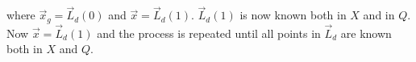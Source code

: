 where $\vec{x}_g = \vec{L}_d(0)$ and $\vec{x} = \vec{L}_d(1)$.  $\vec{L}_d(1)$ is now known both in $X$ and in $Q$.  Now $\vec{x} = \vec{L}_d(1)$ and the process is repeated until all points in $\vec{L}_d$ are known both in $X$ and $Q$.





